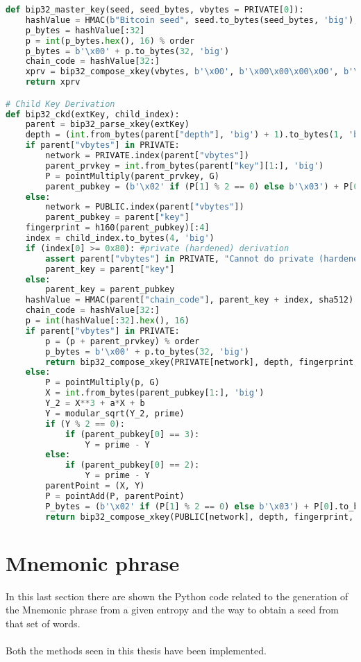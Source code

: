 \begin{lstlisting}[language=Python]
def bip32_master_key(seed, seed_bytes, vbytes = PRIVATE[0]):
	hashValue = HMAC(b"Bitcoin seed", seed.to_bytes(seed_bytes, 'big'), sha512).digest()
	p_bytes = hashValue[:32]
	p = int(p_bytes.hex(), 16) % order
	p_bytes = b'\x00' + p.to_bytes(32, 'big')
	chain_code = hashValue[32:]
	xprv = bip32_compose_xkey(vbytes, b'\x00', b'\x00\x00\x00\x00', b'\x00\x00\x00\x00', chain_code, p_bytes)
	return xprv

# Child Key Derivation
def bip32_ckd(extKey, child_index):
	parent = bip32_parse_xkey(extKey)
	depth = (int.from_bytes(parent["depth"], 'big') + 1).to_bytes(1, 'big')
	if parent["vbytes"] in PRIVATE:
		network = PRIVATE.index(parent["vbytes"])
		parent_prvkey = int.from_bytes(parent["key"][1:], 'big')
		P = pointMultiply(parent_prvkey, G)
		parent_pubkey = (b'\x02' if (P[1] % 2 == 0) else b'\x03') + P[0].to_bytes(32, 'big')
	else:
		network = PUBLIC.index(parent["vbytes"])
		parent_pubkey = parent["key"]
	fingerprint = h160(parent_pubkey)[:4]
	index = child_index.to_bytes(4, 'big')
	if (index[0] >= 0x80): #private (hardened) derivation
		assert parent["vbytes"] in PRIVATE, "Cannot do private (hardened) derivation from Pubkey"
		parent_key = parent["key"]
	else:
		parent_key = parent_pubkey
	hashValue = HMAC(parent["chain_code"], parent_key + index, sha512).digest()
	chain_code = hashValue[32:]
	p = int(hashValue[:32].hex(), 16)
	if parent["vbytes"] in PRIVATE:
		p = (p + parent_prvkey) % order
		p_bytes = b'\x00' + p.to_bytes(32, 'big')
		return bip32_compose_xkey(PRIVATE[network], depth, fingerprint, index, chain_code, p_bytes)
	else:
		P = pointMultiply(p, G)
		X = int.from_bytes(parent_pubkey[1:], 'big')
		Y_2 = X**3 + a*X + b
		Y = modular_sqrt(Y_2, prime)
		if (Y % 2 == 0):
			if (parent_pubkey[0] == 3):
				Y = prime - Y
		else:
			if (parent_pubkey[0] == 2):
				Y = prime - Y
		parentPoint = (X, Y)
		P = pointAdd(P, parentPoint)
		P_bytes = (b'\x02' if (P[1] % 2 == 0) else b'\x03') + P[0].to_bytes(32, 'big')
		return bip32_compose_xkey(PUBLIC[network], depth, fingerprint, index, chain_code, P_bytes)
\end{lstlisting}

\section{Mnemonic phrase}

In this last section there are shown the Python code related to the generation of the Mnemonic phrase from a given entropy and the way to obtain a seed from that set of words. 
\\ \\
Both the methods seen in this thesis have been implemented.



